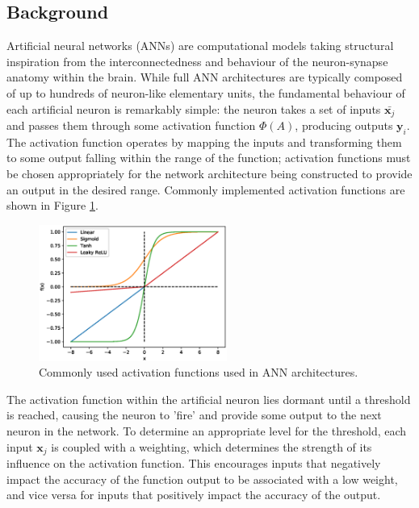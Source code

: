 \documentclass[a4paper, 10pt]{article}
\numberwithin{equation}{section}
\begin{document}
\subsection{Background}
Artificial neural networks (ANNs) are computational models taking structural inspiration from the interconnectedness and behaviour of the neuron-synapse anatomy within the brain. While full ANN architectures are typically composed of up to hundreds of neuron-like elementary units, the fundamental behaviour of each artificial neuron is remarkably simple: the neuron takes a set of inputs $\bar{\textbf{x}_j}$ and passes them through some activation function $\Phi (A)$, producing outputs $\textbf{y}_i$. The activation function operates by mapping the inputs and transforming them to some output falling within the range of the function; activation functions must be chosen appropriately for the network architecture being constructed to provide an output in the desired range. Commonly implemented activation functions are shown in Figure \ref{fig:activation_fns}. 

\begin{figure}[h!]
    \centering
    \includegraphics[width=0.55\textwidth]{images/NN_Generic/activation_function.eps}
    \caption{Commonly used activation functions used in ANN architectures.}
    \label{fig:activation_fns}
\end{figure}

The activation function within the artificial neuron lies dormant until a threshold is reached, causing the neuron to 'fire' and provide some output to the next neuron in the network. To determine an appropriate level for the threshold, each input $\textbf{x}_{j}$ is coupled with a weighting, which determines the strength of its influence on the activation function. This encourages inputs that negatively impact the accuracy of the function output to be associated with a low weight, and vice versa for inputs that positively impact the accuracy of the output.\medbreak
\end{document}
